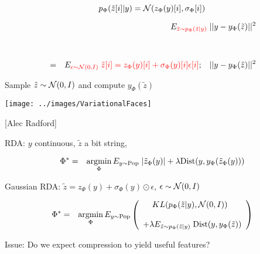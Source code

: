 {

$$p_\Phi(\tilde{z}[i]|y) = {\cal N}(z_\Phi(y)[i],\sigma_\Phi[i])$$

\vfill
\begin{eqnarray*}
& & E_{\color{red} \tilde{z} \sim p_\Phi(\tilde{z}|y)} \;||y - y_\Phi(\tilde{z})||^2 \\
\\
\\
& = & E_{\color{red} \epsilon \sim {\cal N}(0,I)} \;{\color{red} \tilde{z}[i] = z_\Phi(y)[i] + \sigma_\Phi(y)[i]\epsilon[i]};\;\; \;||y -y_\Phi(\tilde{z})||^2
\end{eqnarray*}


\centerline{Sample {\color{red} $\tilde{z} \sim {\cal N}(0,I)$} and compute {\color{red} $y_\Phi(\tilde{z})$}}
\vfill
\centerline{\texttt{[image: ../images/VariationalFaces]}}
\centerline{[Alec Radford]}



RDA: $y$ continuous, $\tilde{z}$ a bit string,

{\color{red}
\begin{eqnarray*}
\Phi^* &  = &  \operatorname*{argmin}_\Phi E_{y \sim \mathrm{Pop}} \;|\tilde{z}_\Phi(y)| + \lambda \mathrm{Dist}(y,y_\Phi(\tilde{z}_\Phi(y)))
\end{eqnarray*}
}

\vfill
Gaussian RDA: {\color{red} $\tilde{z} = z_\Phi(y) + \sigma_\Phi(y) \odot \epsilon$,\hspace{2em} $\epsilon \sim {\cal N}(0,I)$}

{\color{red}
\begin{eqnarray*}
\Phi^* & = & \operatorname*{argmin}_\Phi E_{y \sim \mathrm{Pop}}\left(\begin{array}{l}\;\;\; \;KL(p_\Phi(\tilde{z}|y),{\cal N}(0,I)) \\ \\ + \lambda E_{\tilde{z}\sim p_\Phi(\tilde{z}|y)}\; \mathrm{Dist}(y,y_\Phi(\tilde{z})) \end{array}\right)
\end{eqnarray*}
}

\vfill
Issue: Do we expect compression to yield useful features?


}




